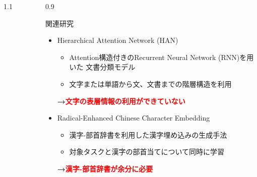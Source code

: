 \documentclass[unicode,10pt]{beamer}
\newlength{\mycolumnwidth}
\newcommand{\arrow}{\textcolor{ttiblue}{\textbf{→}}\hspace{1ex}}
\newcommand{\itemtitle}[1]{#1\\}
\newcommand{\fire}[1]{\textcolor{red}{\textbf{#1}}}
\begin{document}
\begin{frame}[t]
\begin{columns}[onlytextwidth,t]
\begin{column}{1.1\mycolumnwidth}
\begin{figure}
    \end{figure}
  \end{column}
  \begin{column}{0.9\mycolumnwidth}
    \begin{block}{関連研究}
      \begin{itemize}
        \item \itemtitle{Hierarchical Attention Network (HAN) \cite{yang16}}
          \begin{itemize}
            \item Attention構造付きのRecurrent Neural Network (RNN)を用いた
                  文書分類モデル
            \item 文字または単語から文、文書までの階層構造を利用
          \end{itemize}
          \arrow \fire{文字の表層情報の利用ができていない}
        \item \itemtitle{Radical-Enhanced Chinese Character Embedding
                         \cite{sun14}}
          \begin{itemize}
            \item 漢字-部首辞書を利用した漢字埋め込みの生成手法
            \item 対象タスクと漢字の部首当てについて同時に学習
          \end{itemize}
          \arrow \fire{漢字-部首辞書が余分に必要}
      \end{itemize}
    \end{block}
  \end{column}
\end{columns}



\end{frame}
\end{document}
